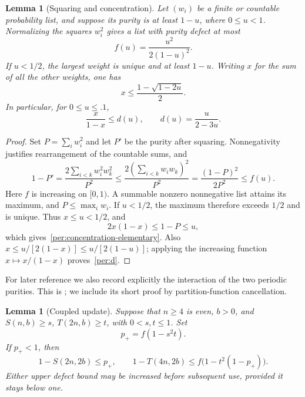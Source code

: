 \documentclass[11pt]{article}
\newtheorem{lemma}[theorem]{Lemma}
\theoremstyle{remark}
\numberwithin{equation}{section}
\begin{document}
\begin{lemma}[Squaring and concentration]\label{per:purity}
Let $(w_i)$ be a finite or countable probability list, and suppose its
purity is at least $1-u$, where $0\le u<1$.  Normalizing the squares
$w_i^2$ gives a list with purity defect at most
\begin{equation}\label{per:f}
 f(u)=\frac{u^2}{2(1-u)^2}.
\end{equation}
If $u<1/2$, the largest weight is unique and at least $1-u$.  Writing
$x$ for the sum of all the other weights, one has
\begin{equation}\label{per:concentration-elementary}
 x\le\frac{1-\sqrt{1-2u}}2.
\end{equation}
In particular, for $0\le u\le .1$,
\begin{equation}\label{per:d}
 \frac{x}{1-x}\le d(u),\qquad d(u)=\frac{u}{2-3u}.
\end{equation}
\end{lemma}

\begin{proof}
Set $P=\sum_iw_i^2$ and let $P'$ be the purity after squaring.
Nonnegativity justifies rearrangement of the countable sums, and
\[
 1-P'=\frac{2\sum_{i<k}w_i^2w_k^2}{P^2}
 \le\frac{2(\sum_{i<k}w_iw_k)^2}{P^2}
 =\frac{(1-P)^2}{2P^2}\le f(u).
\]
Here $f$ is increasing on $[0,1)$.  A summable nonzero nonnegative list
attains its maximum, and $P\le\max_iw_i$.  If $u<1/2$, the maximum
therefore exceeds $1/2$ and is unique.  Thus $x\le u<1/2$, and
\[
 2x(1-x)\le 1-P\le u,
\]
which gives~\eqref{per:concentration-elementary}.  Also
$x\le u/[2(1-x)]\le u/[2(1-u)]$; applying the increasing function
$x\mapsto x/(1-x)$ proves~\eqref{per:d}.
\end{proof}

For later reference we also record explicitly the interaction of the
two periodic purities.  This is \cite[Lemma 4.2]{periodic}; we include its short proof by
partition-function cancellation.

\begin{lemma}[Coupled update]\label{per:coupled}
Suppose that $n\ge4$ is even, $b>0$, and
$S(n,b)\ge s$, $T(2n,b)\ge t$, with $0<s,t\le1$.
Set
\[
 p_+=f(1-s^2t).
\]
If $p_+<1$, then
\begin{equation}\label{per:coupled-formula}
 1-S(2n,2b)\le p_+,\qquad
 1-T(4n,2b)\le f\bigl(1-t^2(1-p_+)\bigr).
\end{equation}
Either upper defect bound may be increased before subsequent use,
provided it stays below one.
\end{lemma}
\end{document}
